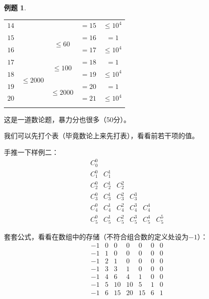 \documentclass{article}
\newtheorem{example}{例题}[subsection]
\theoremstyle{nonumberplain}
\begin{document}
\begin{example}
\begin{center}
\begin{tabular}{c|c|c|c|c}
				\cline{1-1}\cline{4-5}
				$14$   &                              &                              & $=15$ & $\leq 10^4$ \\
				\cline{1-1}\cline{3-3}\cline{4-5}
				$15$   &                              & \multirow{2}{*}{$\leq 60$}   & $=16$ & $=1$        \\
				\cline{1-1}\cline{4-5}
				$16$   &                              &                              & $=17$ & $\leq 10^4$ \\
				\hline
				$17$   & \multirow{4}{*}{$\leq 2000$} & \multirow{2}{*}{$\leq 100$}  & $=18$ & $=1$        \\
				\cline{1-1}\cline{4-5}
				$18$   &                              &                              & $=19$ & $\leq 10^4$ \\
				\cline{1-1}\cline{3-3}\cline{4-5}
				$19$   &                              & \multirow{2}{*}{$\leq 2000$} & $=20$ & $=1$        \\
				\cline{1-1}\cline{4-5}
				$20$   &                              &                              & $=21$ & $\leq 10^4$ \\
				\Xhline{1.2pt}
			\end{tabular}
		\end{center}
	\end{example}

	这是一道数论题，暴力分也很多（50分）。

	我们可以先打个表（毕竟数论上来先打表），看看前若干项的值。

	手推一下样例二：
	\begin{equation*}
		\begin{matrix}
			C^0_0                                         \\
			C^0_1 & C^1_1                                 \\
			C^0_2 & C^1_2 & C^2_2                         \\
			C^0_3 & C^1_3 & C^2_3 & C^3_3                 \\
			C^0_4 & C^1_4 & C^2_4 & C^3_4 & C^4_4         \\
			C^0_5 & C^1_5 & C^2_5 & C^3_5 & C^4_5 & C^5_5
		\end{matrix}
	\end{equation*}

	套套公式，看看在数组中的存储（不符合组合数的定义处设为$-1$）：
	\begin{equation*}
		\begin{matrix}
			-1 & 0 & 0  & 0  & 0  & 0 & 0 \\
			-1 & 1 & 0  & 0  & 0  & 0 & 0 \\
			-1 & 2 & 1  & 0  & 0  & 0 & 0 \\
			-1 & 3 & 3  & 1  & 0  & 0 & 0 \\
			-1 & 4 & 6  & 4  & 1  & 0 & 0 \\
			-1 & 5 & 10 & 10 & 5  & 1 & 0 \\
			-1 & 6 & 15 & 20 & 15 & 6 & 1
		\end{matrix}
	\end{equation*}
\end{document}
